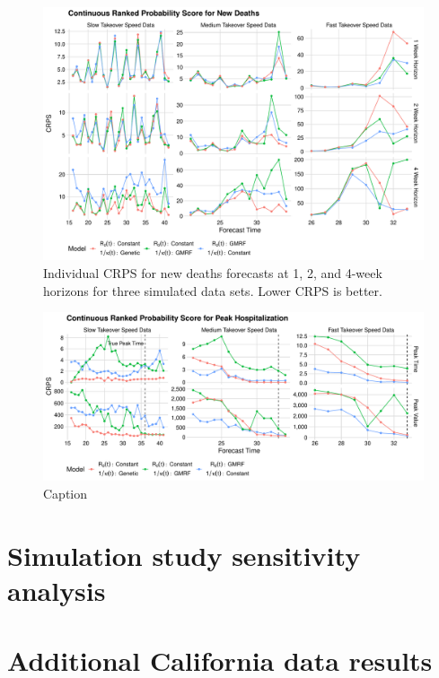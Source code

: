 \begin{figure}
    \centering
    \includegraphics[width=1.0\columnwidth]{simulated_crps_comparison_data_new_deaths_plot}
    \caption{Individual CRPS for new deaths forecasts at 1, 2, and 4-week horizons for three simulated data sets. Lower CRPS is better.}
    \label{ch_5:fig:simulated_crps_comparison_data_new_deaths_plot}
\end{figure}

\begin{figure}
    \centering
    \includegraphics[width=1.0\columnwidth]{simulated_peak_crps_plot}
    \caption{Caption}
    \label{ch_5:fig:simulated_peak_crps_plot}
\end{figure}

\section{Simulation study sensitivity analysis}
\label{ch_5:sec:sim_sensitivity}

\section{Additional California data results}


